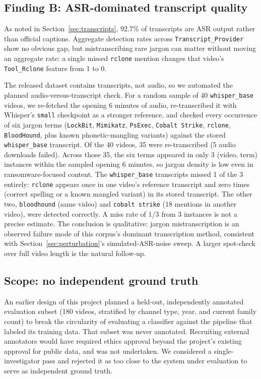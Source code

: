\documentclass[preprint,12pt]{elsarticle}
\begin{document}
\subsection{Finding B: ASR-dominated transcript quality}
\label{sec:finding-b}
As noted in Section~\ref{sec:transcripts}, 92.7\% of transcripts are ASR
output rather than official captions. Aggregate detection rates across
\texttt{Transcript\_Provider} show no obvious gap, but mistranscribing rare
jargon can matter without moving an aggregate rate: a single missed
\texttt{rclone} mention changes that video's \texttt{Tool\_Rclone} feature
from 1 to 0.

The released dataset contains transcripts, not audio, so we automated the
planned audio-versus-transcript check. For a random sample of 40
\texttt{whisper\_base} videos, we re-fetched the opening 6 minutes of audio,
re-transcribed it with Whisper's \texttt{small} checkpoint as a stronger
reference, and checked every occurrence of six jargon terms
(\texttt{LockBit}, \texttt{Mimikatz}, \texttt{PsExec}, \texttt{Cobalt
Strike}, \texttt{rclone}, \texttt{BloodHound}, plus known phonetic-mangling
variants) against the stored \texttt{whisper\_base} transcript. Of the 40
videos, 35 were re-transcribed (5 audio downloads failed). Across those 35,
the six terms appeared in only 3 (video, term) instances within the sampled
opening 6 minutes, so jargon density is low even in ransomware-focused
content. The \texttt{whisper\_base} transcripts missed 1 of the 3 entirely:
\texttt{rclone} appears once in one video's reference transcript and zero
times (correct spelling or a known mangled variant) in its stored
transcript. The other two, \texttt{bloodhound} (same video) and
\texttt{cobalt strike} (18 mentions in another video), were detected
correctly. A miss rate of 1/3 from 3 instances is not a precise estimate.
The conclusion is qualitative: jargon mistranscription is an observed
failure mode of this corpus's dominant transcription method, consistent with
Section~\ref{sec:perturbation}'s simulated-ASR-noise sweep. A larger
spot-check over full video length is the natural follow-up.

\subsection{Scope: no independent ground truth}
\label{sec:gold-scope}
An earlier design of this project planned a held-out, independently
annotated evaluation subset (180 videos, stratified by channel type, year,
and current family count) to break the circularity of evaluating a
classifier against the pipeline that labeled its training data. That subset
was never annotated. Recruiting external annotators would have required
ethics approval beyond the project's existing approval for public data, and
was not undertaken. We considered a single-investigator pass and rejected it
as too close to the system under evaluation to serve as independent ground
truth.
\end{document}
